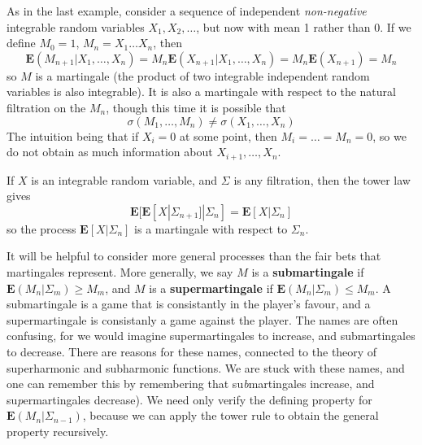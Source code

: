 \begin{example}
    As in the last example, consider a sequence of independent {\it non-negative} integrable random variables $X_1, X_2, \dots$, but now with mean 1 rather than 0. If we define $M_0 = 1$, $M_n = X_1 \dots X_n$, then
    \[ \mathbf{E}(M_{n+1}|X_1, \dots, X_n) = M_n \mathbf{E}(X_{n+1}|X_1, \dots, X_n) = M_n \mathbf{E}(X_{n+1}) = M_n \]
    so $M$ is a martingale (the product of two integrable independent random variables is also integrable). It is also a martingale with respect to the natural filtration on the $M_n$, though this time it is possible that
    \[ \sigma(M_1, \dots, M_n) \neq \sigma(X_1, \dots, X_n) \]
    The intuition being that if $X_i = 0$ at some point, then $M_i = \dots = M_n = 0$, so we do not obtain as much information about $X_{i+1}, \dots, X_n$.
\end{example}

\begin{example}
    If $X$ is an integrable random variable, and $\Sigma$ is any filtration, then the tower law gives
    \[ \mathbf{E}[\mathbf{E}[X|\Sigma_{n+1}]|\Sigma_n] = \mathbf{E}[X|\Sigma_n] \]
    so the process $\mathbf{E}[X|\Sigma_n]$ is a martingale with respect to $\Sigma_n$.
\end{example}

It will be helpful to consider more general processes than the fair bets that martingales represent. More generally, we say $M$ is a {\bf submartingale} if $\mathbf{E}(M_n|\Sigma_m) \geq M_m$, and $M$ is a {\bf supermartingale} if $\mathbf{E}(M_n|\Sigma_m) \leq M_m$. A submartingale is a game that is consistantly in the player's favour, and a supermartingale is consistanly a game against the player. The names are often confusing, for we would imagine supermartingales to increase, and submartingales to decrease. There are reasons for these names, connected to the theory of superharmonic and subharmonic functions. We are stuck with these names, and one can remember this by remembering that su{\it b}martingales increase, and su{\it p}ermartingales decrease). We need only verify the defining property for $\mathbf{E}(M_n|\Sigma_{n-1})$, because we can apply the tower rule to obtain the general property recursively.

